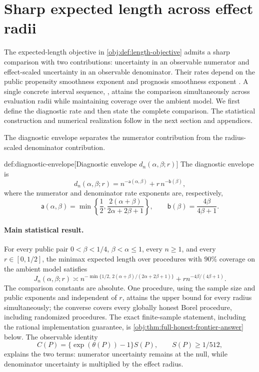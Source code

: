 \section{Sharp expected length across effect radii}

The expected-length objective in \cref{obj:def:length-objective} admits a sharp comparison with two contributions: uncertainty in an observable numerator and effect-scaled uncertainty in an observable denominator. Their rates depend on the public propensity smoothness exponent  and prognosis smoothness exponent . A single concrete interval sequence, , attains the comparison simultaneously across evaluation radii while maintaining coverage over the ambient model. We first define the diagnostic rate and then state the complete comparison. The statistical construction and numerical realization follow in the next section and appendices.

The diagnostic envelope  separates the numerator contribution from the radius-scaled denominator contribution.

\begin{definitionv}{def:diagnostic-envelope}[Diagnostic envelope \(d_n(\alpha,\beta;r)\)]
The diagnostic envelope is
\[
d_n(\alpha,\beta;r)
=
n^{-\mathsf a(\alpha,\beta)}
+r\,n^{-\mathsf b(\beta)},
\]
where the numerator and denominator rate exponents are, respectively,
\[
\mathsf a(\alpha,\beta)
=
\min\left\{\frac12,\frac{2(\alpha+\beta)}{2\alpha+2\beta+1}\right\},
\qquad
\mathsf b(\beta)=\frac{4\beta}{4\beta+1}.
\]
\end{definitionv}

\paragraph{Main statistical result.}
For every public pair \(0<\beta<1/4\), \(\beta<\alpha\le1\), every
\(n\ge1\), and every \(r\in[0,1/2]\), the minimax expected length over
procedures with \(90\%\) coverage on the ambient model satisfies
\[
J_n(\alpha,\beta;r)\asymp
n^{-\min\{1/2,\,2(\alpha+\beta)/(2\alpha+2\beta+1)\}}
+r n^{-4\beta/(4\beta+1)}.
\]
The comparison constants are absolute. One procedure, using the sample size and
public exponents and independent of \(r\), attains the upper bound for every
radius simultaneously; the converse covers every globally honest Borel
procedure, including randomized procedures. The exact finite-sample statement,
including the rational implementation guarantee, is
\cref{obj:thm:full-honest-frontier-answer} below. The observable identity
\[
C(P)=\{\exp(\theta(P))-1\}S(P),\qquad S(P)\ge1/512,
\]
explains the two terms: numerator uncertainty remains at the null, while
denominator uncertainty is multiplied by the effect radius.

